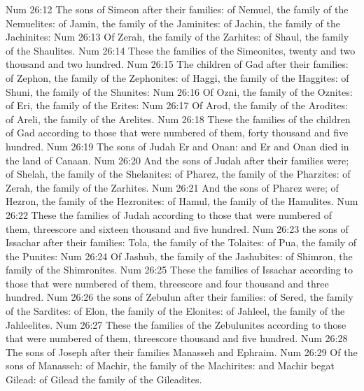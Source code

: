 \vs Num 26:12 The sons of Simeon after their families: of Nemuel, the family of the Nemuelites: of Jamin, the family of the Jaminites: of Jachin, the family of the Jachinites:
\vs Num 26:13 Of Zerah, the family of the Zarhites: of Shaul, the family of the Shaulites.
\vs Num 26:14 These  the families of the Simeonites, twenty and two thousand and two hundred.
\vs Num 26:15 The children of Gad after their families: of Zephon, the family of the Zephonites: of Haggi, the family of the Haggites: of Shuni, the family of the Shunites:
\vs Num 26:16 Of Ozni, the family of the Oznites: of Eri, the family of the Erites:
\vs Num 26:17 Of Arod, the family of the Arodites: of Areli, the family of the Arelites.
\vs Num 26:18 These  the families of the children of Gad according to those that were numbered of them, forty thousand and five hundred.
\vs Num 26:19 The sons of Judah  Er and Onan: and Er and Onan died in the land of Canaan.
\vs Num 26:20 And the sons of Judah after their families were; of Shelah, the family of the Shelanites: of Pharez, the family of the Pharzites: of Zerah, the family of the Zarhites.
\vs Num 26:21 And the sons of Pharez were; of Hezron, the family of the Hezronites: of Hamul, the family of the Hamulites.
\vs Num 26:22 These  the families of Judah according to those that were numbered of them, threescore and sixteen thousand and five hundred.
\vs Num 26:23  the sons of Issachar after their families:  Tola, the family of the Tolaites: of Pua, the family of the Punites:
\vs Num 26:24 Of Jashub, the family of the Jashubites: of Shimron, the family of the Shimronites.
\vs Num 26:25 These  the families of Issachar according to those that were numbered of them, threescore and four thousand and three hundred.
\vs Num 26:26  the sons of Zebulun after their families: of Sered, the family of the Sardites: of Elon, the family of the Elonites: of Jahleel, the family of the Jahleelites.
\vs Num 26:27 These  the families of the Zebulunites according to those that were numbered of them, threescore thousand and five hundred.
\vs Num 26:28 The sons of Joseph after their families  Manasseh and Ephraim.
\vs Num 26:29 Of the sons of Manasseh: of Machir, the family of the Machirites: and Machir begat Gilead: of Gilead  the family of the Gileadites.
